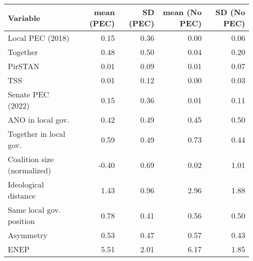 
\begin{tabular}{l|r|r|r|r}
\hline
Variable & mean (PEC) & SD (PEC) & mean (No PEC) & SD (No PEC)\\
\hline
Local PEC (2018) & 0.15 & 0.36 & 0.00 & 0.06\\
\hline
Together & 0.48 & 0.50 & 0.04 & 0.20\\
\hline
PirSTAN & 0.01 & 0.09 & 0.01 & 0.07\\
\hline
TSS & 0.01 & 0.12 & 0.00 & 0.03\\
\hline
Senate PEC (2022) & 0.15 & 0.36 & 0.01 & 0.11\\
\hline
ANO in local gov. & 0.42 & 0.49 & 0.45 & 0.50\\
\hline
Together in local gov. & 0.59 & 0.49 & 0.73 & 0.44\\
\hline
Coalition size (normalized) & -0.40 & 0.69 & 0.02 & 1.01\\
\hline
Ideological distance & 1.43 & 0.96 & 2.96 & 1.88\\
\hline
Same local gov. position & 0.78 & 0.41 & 0.56 & 0.50\\
\hline
Asymmetry & 0.53 & 0.47 & 0.57 & 0.43\\
\hline
ENEP & 5.51 & 2.01 & 6.17 & 1.85\\
\hline
\end{tabular}
